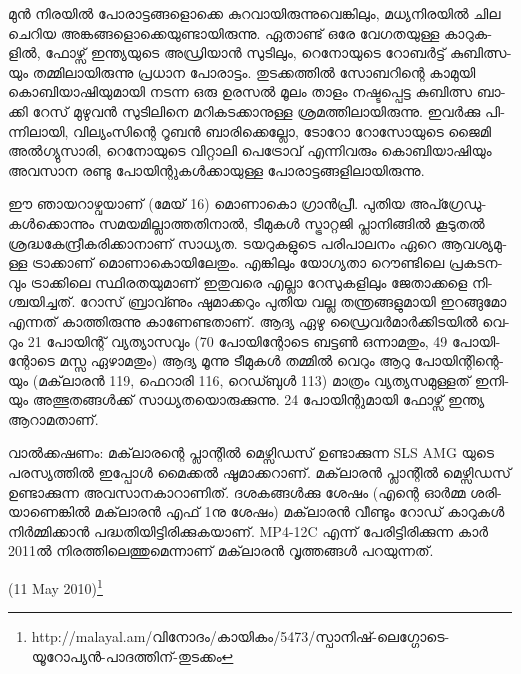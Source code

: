 ­മുന്‍ നി­ര­യില്‍ പോ­രാ­ട്ട­ങ്ങ­ളൊ­ക്കെ കു­റ­വാ­യി­രു­ന്നു­വെ­ങ്കി­ലും, മധ്യ­നി­ര­യില്‍ ചില ചെ­റിയ അങ്ക­ങ്ങ­ളൊ­ക്കെ­യു­ണ്ടാ­യി­രു­ന്നു.
ഏതാ­ണ്ട് ഒരേ വേ­ഗ­ത­യു­ള്ള കാ­റു­ക­ളില്‍, ഫോ­ഴ്സ് ഇന്ത്യ­യു­ടെ അഡ്രി­യാന്‍ സു­ടി­ലും, റെ­നോ­യു­ടെ റോ­ബര്‍­ട്ട് കു­ബി­ത്സ­യും 
തമ്മി­ലാ­യി­രു­ന്നു പ്ര­ധാന പോ­രാ­ട്ടം. തു­ട­ക്ക­ത്തില്‍ സോ­ബ­റി­ന്റെ കാ­മു­യി കൊ­ബി­യാ­ഷി­യു­മാ­യി നട­ന്ന ഒരു ഉര­സല്‍ മൂ­ലം 
താ­ളം നഷ്ട­പ്പെ­ട്ട കു­ബി­ത്സ ബാ­ക്കി റേ­സ് മു­ഴു­വന്‍ സു­ടി­ലി­നെ മറി­ക­ട­ക്കാ­നു­ള്ള ശ്ര­മ­ത്തി­ലാ­യി­രു­ന്നു. ഇവര്‍­ക്കു പി­ന്നി­ലാ­യി, 
വി­ല്യം­സി­ന്റെ റൂ­ബന്‍ ബാ­രി­ക്കെ­ല്ലോ, ടോ­റോ റോ­സോ­യു­ടെ ജൈ­മി അല്‍­ഗ്യു­സാ­രി, റെ­നോ­യു­ടെ വി­റ്റാ­ലി പെ­ട്രോ­വ് 
എന്നി­വ­രും കൊ­ബി­യാ­ഷി­യും അവ­സാന രണ്ടു പോ­യി­ന്റു­കള്‍­ക്കാ­യു­ള്ള പോ­രാ­ട്ട­ങ്ങ­ളി­ലാ­യി­രു­ന്നു­.

ഈ ഞാ­യ­റാ­ഴ്വ­യാ­ണ് (മേ­യ് 16) മൊ­ണാ­കൊ ഗ്രാന്‍­പ്രീ. പു­തിയ അപ്ഗ്രേ­ഡു­കള്‍­ക്കൊ­ന്നും സമ­യ­മി­ല്ലാ­ത്ത­തി­നാല്‍, 
ടീ­മു­കള്‍ സ്ട്രാ­റ്റ­ജി പ്ലാ­നി­ങ്ങില്‍ കൂ­ടു­തല്‍ ശ്ര­ദ്ധ­കേ­ന്ദ്രീ­ക­രി­ക്കാ­നാ­ണ് സാ­ധ്യ­ത. ടയ­റു­ക­ളു­ടെ പരി­പാ­ല­നം ഏറെ ആവ­ശ്യ­മു­ള്ള 
ട്രാ­ക്കാ­ണ് മൊ­ണാ­കൊ­യി­ലേ­തും. എങ്കി­ലും യോ­ഗ്യ­താ റൌ­ണ്ടി­ലെ പ്ര­ക­ട­ന­വും ട്രാ­ക്കി­ലെ സ്ഥി­ര­ത­യു­മാ­ണ് ഇതു­വ­രെ 
എല്ലാ ­റേ­സു­ക­ളി­ലും ജേ­താ­ക്ക­ളെ നി­ശ്ച­യി­ച്ച­ത്. റോ­സ് ബ്രാ­വ്ണും ഷു­മാ­ക്ക­റും പു­തിയ വല്ല­ ത­ന്ത്ര­ങ്ങ­ളു­മാ­യി ഇറ­ങ്ങു­മോ
എന്ന­ത് കാ­ത്തി­രു­ന്നു കാ­ണേ­ണ്ട­താ­ണ്. ആദ്യ ഏഴു ഡ്രൈ­വര്‍­മാര്‍­ക്കി­ട­യില്‍ വെ­റും 21 പോ­യി­ന്റ് വ്യ­ത്യാ­സ­വും­ 
(70 പോ­യി­ന്റോ­ടെ ബട്ടണ്‍ ഒന്നാ­മ­തും, 49 പോ­യി­ന്റോ­ടെ മസ്സ ഏഴാ­മ­തും) ആദ്യ മൂ­ന്നു ടീ­മു­കള്‍ തമ്മില്‍ വെ­റും ആറു 
പോ­യി­ന്റി­ന്റെ­യും ­(­മ­ക്‌­ലാ­രന്‍ 119, ­ഫെ­റാ­രി­ 116, ­റെ­ഡ്ബുള്‍ 113) മാ­ത്രം വ്യ­ത്യ­സ­മു­ള്ള­ത് ഇനി­യും അത്ഭു­ത­ങ്ങള്‍­ക്ക് 
സാ­ധ്യ­ത­യൊ­രു­ക്കു­ന്നു. 24 പോ­യി­ന്റു­മാ­യി ഫോ­ഴ്സ് ഇന്ത്യ ആറാ­മ­താ­ണ്.

­വാല്‍­ക്ക­ഷ­ണം: മക്‌­ലാ­ര­ന്റെ പ്ലാ­ന്റില്‍ മെ­ഴ്സി­ഡ­സ് ഉണ്ടാ­ക്കു­ന്ന SLS AMG യു­ടെ പര­സ്യ­ത്തില്‍ ഇപ്പോള്‍ മൈ­ക്കല്‍ 
ഷൂ­മാ­ക്ക­റാ­ണ്. മക്‌­ലാ­രന്‍ പ്ലാ­ന്റില്‍ മെ­ഴ്സി­ഡ­സ് ഉണ്ടാ­ക്കു­ന്ന അവ­സാ­ന­കാ­റാ­ണി­ത്. ദശ­ക­ങ്ങള്‍­ക്കു ശേ­ഷം ­(എ­ന്റെ 
ഓര്‍­മ്മ ശരി­യാ­ണെ­ങ്കില്‍ മക്‌­ലാ­രന്‍ എഫ് 1നു ശേ­ഷം) മക്‌­ലാ­രന്‍ വീ­ണ്ടും റോ­ഡ് കാ­റു­കള്‍ നിര്‍­മ്മി­ക്കാന്‍ 
പദ്ധ­തി­യി­ട്ടി­രി­ക്കു­ക­യാ­ണ്. MP4-12C എന്ന് പേ­രി­ട്ടി­രി­ക്കു­ന്ന കാര്‍ 2011ല്‍ നി­ര­ത്തി­ലെ­ത്തു­മെ­ന്നാ­ണ് മക്‌­ലാ­രന്‍ 
വൃ­ത്ത­ങ്ങള്‍ പറ­യു­ന്ന­ത്.

(11 May 2010)\footnote{http://malayal.am/വിനോദം/കായികം/5473/സ്പാനിഷ്-ലെഗ്ഗോടെ-യൂറോപ്യന്‍-പാദത്തിന്-തുടക്കം}

\newpage
